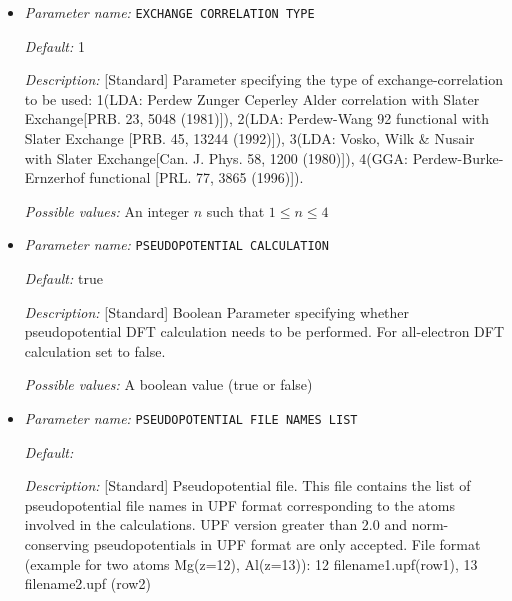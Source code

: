 \begin{itemize}
\item {\it Parameter name:} {\tt EXCHANGE CORRELATION TYPE}
\label{parameters:DFT functional related parameters/EXCHANGE CORRELATION TYPE}
\label{parameters:DFT_20functional_20related_20parameters/EXCHANGE_20CORRELATION_20TYPE}




{\it Default:} 1


{\it Description:} [Standard] Parameter specifying the type of exchange-correlation to be used: 1(LDA: Perdew Zunger Ceperley Alder correlation with Slater Exchange[PRB. 23, 5048 (1981)]), 2(LDA: Perdew-Wang 92 functional with Slater Exchange [PRB. 45, 13244 (1992)]), 3(LDA: Vosko, Wilk \& Nusair with Slater Exchange[Can. J. Phys. 58, 1200 (1980)]), 4(GGA: Perdew-Burke-Ernzerhof functional [PRL. 77, 3865 (1996)]).


{\it Possible values:} An integer $n$ such that $1\leq n \leq 4$
\item {\it Parameter name:} {\tt PSEUDOPOTENTIAL CALCULATION}
\label{parameters:DFT functional related parameters/PSEUDOPOTENTIAL CALCULATION}
\label{parameters:DFT_20functional_20related_20parameters/PSEUDOPOTENTIAL_20CALCULATION}




{\it Default:} true


{\it Description:} [Standard] Boolean Parameter specifying whether pseudopotential DFT calculation needs to be performed. For all-electron DFT calculation set to false.


{\it Possible values:} A boolean value (true or false)
\item {\it Parameter name:} {\tt PSEUDOPOTENTIAL FILE NAMES LIST}
\label{parameters:DFT functional related parameters/PSEUDOPOTENTIAL FILE NAMES LIST}
\label{parameters:DFT_20functional_20related_20parameters/PSEUDOPOTENTIAL_20FILE_20NAMES_20LIST}




{\it Default:} 


{\it Description:} [Standard] Pseudopotential file. This file contains the list of pseudopotential file names in UPF format corresponding to the atoms involved in the calculations. UPF version greater than 2.0 and norm-conserving pseudopotentials in UPF format are only accepted. File format (example for two atoms Mg(z=12), Al(z=13)): 12 filename1.upf(row1), 13 filename2.upf (row2)



\end{itemize}
